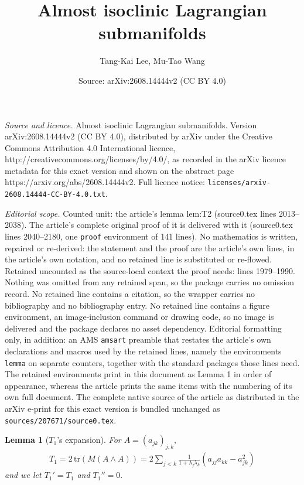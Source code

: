 \documentclass[10pt,a4paper]{amsart}
\title{Almost isoclinic Lagrangian submanifolds}
\author{Tang-Kai Lee, Mu-Tao Wang}
\date{Source: arXiv:2608.14444v2 (CC BY 4.0)}
\newtheorem{lemma}{Lemma}
\newcommand{\pr}[1]{\left(#1\right)}
\newcommand{\tr}{\text{tr}}
\begin{document}
\maketitle

\noindent\emph{Source and licence.} Almost isoclinic Lagrangian submanifolds. Version arXiv:2608.14444v2 (CC BY 4.0), distributed by arXiv under the Creative Commons Attribution 4.0 International licence, http://creativecommons.org/licenses/by/4.0/, as recorded in the arXiv licence metadata for this exact version and shown on the abstract page https://arxiv.org/abs/2608.14444v2. Full licence notice: \texttt{licenses/arxiv-2608.14444-CC-BY-4.0.txt}.\par\smallskip

\noindent\textit{Editorial scope.} Counted unit: the article's lemma lem:T2 (source0.tex lines 2013--2038). The article's complete original proof of it is delivered with it (source0.tex lines 2040--2180, one \texttt{proof} environment of 141 lines). No mathematics is written, repaired or re-derived: the statement and the proof are the article's own lines, in the article's own notation, and no retained line is substituted or re-flowed.  Retained uncounted as the source-local context the proof needs: lines 1979--1990.  Nothing was omitted from any retained span, so the package carries no omission record.  No retained line contains a citation, so the wrapper carries no bibliography and no bibliography entry.  No retained line contains a figure environment, an image-inclusion command or drawing code, so no image is delivered and the package declares no asset dependency.  Editorial formatting only, in addition: an AMS \texttt{amsart} preamble that restates the article's own declarations and macros used by the retained lines, namely the environments \texttt{lemma} on separate counters, together with the standard packages those lines need.  The retained environments print in this document as Lemma 1 in order of appearance, whereas the article prints the same items with the numbering of its own full document.  The complete native source of the article as distributed in the arXiv e-print for this exact version is bundled unchanged as \texttt{sources/207671/source0.tex}.
\begin{lemma}
	[$T_1$'s expansion]
	\label{lem:T1}
	For $A=(a_{jk})_{j,k},$
	\begin{align*}
	T_1
	= 2\,\tr\pr{M (A\wedge A)}
	= 2 \sum_{j<k} \frac 1{1+\lambda_j\lambda_k} 
	\pr{a_{jj}a_{kk} - a_{jk}^2}
	\end{align*}
	and we let $T_1'=T_1$ and $T_1''=0.$
\end{lemma}
\end{document}
